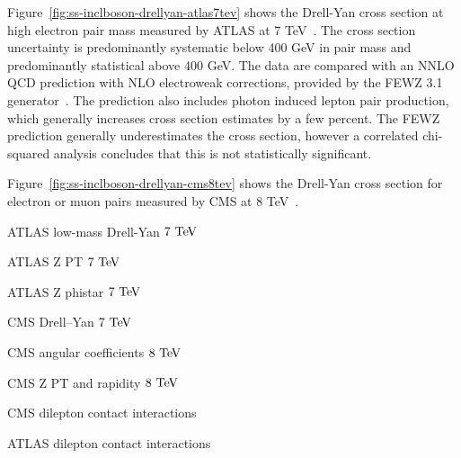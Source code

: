 Figure~\ref{fig:ss-inclboson-drellyan-atlas7tev} shows the Drell-Yan cross
section at high electron pair mass measured by ATLAS at 7 TeV~\cite{Aad:2013iua}.
The cross section uncertainty is predominantly systematic below 400 GeV in pair
mass and predominantly statistical above 400 GeV.  The data are compared with an NNLO QCD
prediction with NLO electroweak corrections, provided by the FEWZ 3.1 generator~\cite{FEWZ}.
The prediction also includes photon induced lepton pair production, which generally
increases cross section estimates by a few percent. The FEWZ prediction generally underestimates the cross section,
however a correlated chi-squared analysis concludes that this is not statistically significant.

Figure~\ref{fig:ss-inclboson-drellyan-cms8tev} shows the Drell-Yan cross section for electron or muon pairs
measured by CMS at 8 TeV~\cite{CMS:2014jea}.

ATLAS low-mass Drell-Yan $7 \TeV$~\cite{Aad:2014qja}

ATLAS Z PT $7 \TeV$~\cite{Aad:2014xaa}

ATLAS Z phistar $7 \TeV$~\cite{Aad:2012wfa}

CMS Drell--Yan $7 \TeV$~\cite{Chatrchyan:2013tia}

CMS angular coefficients $8 \TeV$~\cite{Khachatryan:2015paa}

CMS Z PT and rapidity $8 \TeV$~\cite{Khachatryan:2015oaa}

CMS dilepton contact interactions~\cite{Khachatryan:2014fba}

ATLAS dilepton contact interactions~\cite{Aad:2014wca}

